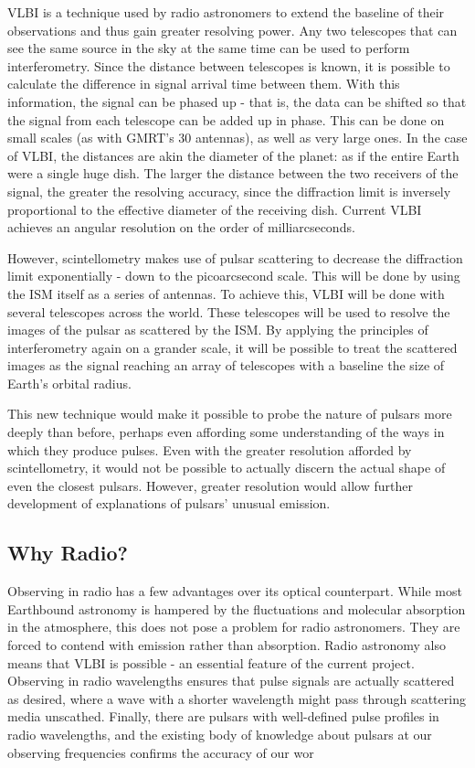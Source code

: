 \documentclass[a4paper,12pt]{article}
\begin{document}
VLBI is a technique used by radio astronomers to extend the baseline of their observations and thus gain greater resolving power. Any two telescopes that can see the same source in the sky at the same time can be used to perform interferometry. Since the distance between telescopes is known, it is possible to calculate the difference in signal arrival time between them. With this information, the signal can be phased up - that is, the data can be shifted so that the signal from each telescope can be added up in phase. This can be done on small scales (as with GMRT's 30 antennas), as well as very large ones. In the case of VLBI, the distances are akin the diameter of the planet: as if the entire Earth were a single huge dish. The larger the distance between the two receivers of the signal, the greater the resolving accuracy, since the diffraction limit is inversely proportional to the effective diameter of the receiving dish. Current VLBI achieves an angular resolution on the order of milliarcseconds\citep{anisotropicinsterstellar}. 

However, scintellometry makes use of pulsar scattering to decrease the diffraction limit exponentially - down to the picoarcsecond scale\citep{picoarcsecondastrometry}. This will be done by using the ISM itself as a series of antennas. To achieve this, VLBI will be done with several telescopes across the world. These telescopes will be used to resolve the images of the pulsar as scattered by the ISM\citep{anisotropicinsterstellar}. By applying the principles of interferometry again on a grander scale, it will be possible to treat the scattered images as the signal reaching an array of telescopes with a baseline the size of Earth's orbital radius.

This new technique would make it possible to probe the nature of pulsars more deeply than before, perhaps even affording some understanding of the ways in which they produce pulses. Even with the greater resolution afforded by scintellometry, it would not be possible to actually discern the actual shape of even the closest pulsars. However, greater resolution would allow further development of explanations of pulsars' unusual emission.

\subsection{Why Radio?}
\label{sec:radio}

Observing in radio has a few advantages over its optical counterpart. While most Earthbound astronomy is hampered by the fluctuations and molecular absorption in the atmosphere, this does not pose a problem for radio astronomers. They are forced to contend with emission rather than absorption. Radio astronomy also means that VLBI is possible - an essential feature of the current project. Observing in radio wavelengths ensures that pulse signals are actually scattered as desired, where a wave with a shorter wavelength might pass through scattering media unscathed. Finally, there are pulsars with well-defined pulse profiles in radio wavelengths, and the existing body of knowledge about pulsars at our observing frequencies confirms the accuracy of our wor
\end{document}
